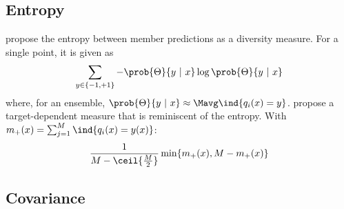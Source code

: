 \documentclass[../main.tex]{subfiles}
\begin{document}
\subsection{Entropy}
\citeauthor{CunninghamCarney2000} propose the entropy between member predictions as a diversity measure. For a single point, it is given as
$$
\sum_{y \in \{ -1, +1 \}} - \prob{\Theta}{y ~|~x} \log \prob{\Theta}{y~|~x}
$$
where, for an ensemble, $\prob{\Theta}{y~|~x} \approx \Mavg \ind{q_{i}(x) = y}$.
\citeauthor{ShippKuncheva2002} propose a target-dependent measure that is reminiscent of the entropy. With $m_{+}(x) = \sum_{j=1}^M \ind{q_{i}(x) = y(x)}$:
$$
\frac{1}{M - \ceil{\frac{M}{2}}} \min \{ m_{+}(x), M-m_{+}(x) \}
$$

\subsection{Covariance}
\label{sec:bias-variance-covariance}
\end{document}
